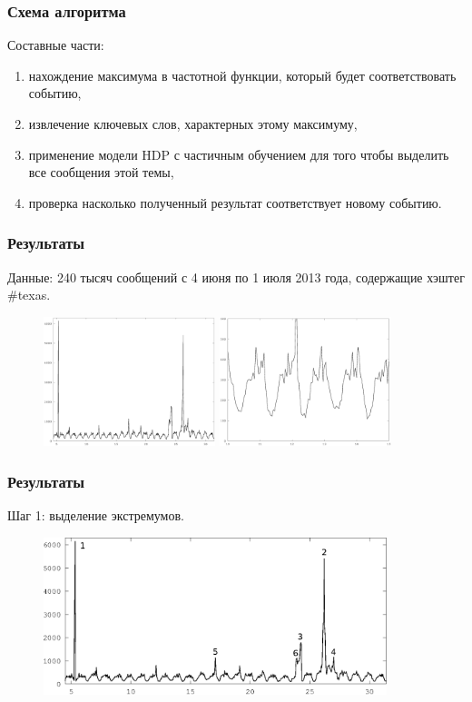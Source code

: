\documentclass[10pt,pdf,hyperref={unicode}]{beamer}
\begin{document}
\begin{frame}
  \frametitle{Схема алгоритма}
  Составные части:
  \begin{enumerate}  
  \item нахождение максимума в частотной функции, который будет соответствовать событию,
  \item извлечение ключевых слов, характерных этому максимуму,
  \item применение модели HDP с частичным обучением для того чтобы выделить все сообщения этой темы,
  \item проверка насколько полученный результат соответствует новому событию.
  \end{enumerate}
\end{frame}

\begin{frame}
  \frametitle{Результаты}
  Данные: 240 тысяч сообщений с 4 июня по 1 июля 2013 года, содержащие хэштег \#texas.
  \begin{figure}[H]
  \centering
  \includegraphics[width=5.0cm]{all-freq.eps}
  \includegraphics[width=5.0cm]{all-freq-scaled.eps}
  \end{figure}
\end{frame}

\begin{frame}
\frametitle{Результаты}
 Шаг 1: выделение экстремумов.
 \begin{figure}[H]
  \centering
  \includegraphics[width=10.0cm]{all-freq-labeled-1.eps}
  \label{fig:all-freq-labeled}
 \end{figure}
\end{frame}
\end{document}
